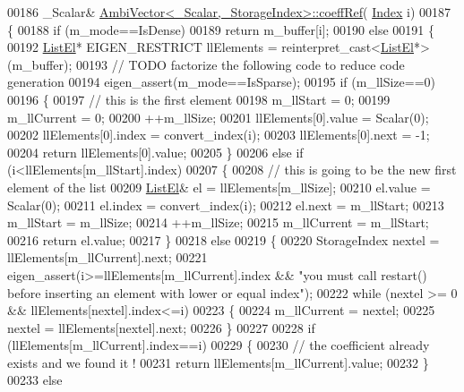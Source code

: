 \begin{DoxyCode}
00186 \_Scalar& \hyperlink{class_eigen_1_1internal_1_1_ambi_vector}{AmbiVector<\_Scalar,\_StorageIndex>::coeffRef}(
      \hyperlink{namespace_eigen_a62e77e0933482dafde8fe197d9a2cfde}{Index} i)
00187 \{
00188   \textcolor{keywordflow}{if} (m\_mode==IsDense)
00189     \textcolor{keywordflow}{return} m\_buffer[i];
00190   \textcolor{keywordflow}{else}
00191   \{
00192     \hyperlink{struct_eigen_1_1internal_1_1_ambi_vector_1_1_list_el}{ListEl}* EIGEN\_RESTRICT llElements = \textcolor{keyword}{reinterpret\_cast<}\hyperlink{struct_eigen_1_1internal_1_1_ambi_vector_1_1_list_el}{ListEl}*\textcolor{keyword}{>}(m\_buffer);
00193     \textcolor{comment}{// TODO factorize the following code to reduce code generation}
00194     eigen\_assert(m\_mode==IsSparse);
00195     \textcolor{keywordflow}{if} (m\_llSize==0)
00196     \{
00197       \textcolor{comment}{// this is the first element}
00198       m\_llStart = 0;
00199       m\_llCurrent = 0;
00200       ++m\_llSize;
00201       llElements[0].value = Scalar(0);
00202       llElements[0].index = convert\_index(i);
00203       llElements[0].next = -1;
00204       \textcolor{keywordflow}{return} llElements[0].value;
00205     \}
00206     \textcolor{keywordflow}{else} \textcolor{keywordflow}{if} (i<llElements[m\_llStart].index)
00207     \{
00208       \textcolor{comment}{// this is going to be the new first element of the list}
00209       \hyperlink{struct_eigen_1_1internal_1_1_ambi_vector_1_1_list_el}{ListEl}& el = llElements[m\_llSize];
00210       el.value = Scalar(0);
00211       el.index = convert\_index(i);
00212       el.next = m\_llStart;
00213       m\_llStart = m\_llSize;
00214       ++m\_llSize;
00215       m\_llCurrent = m\_llStart;
00216       \textcolor{keywordflow}{return} el.value;
00217     \}
00218     \textcolor{keywordflow}{else}
00219     \{
00220       StorageIndex nextel = llElements[m\_llCurrent].next;
00221       eigen\_assert(i>=llElements[m\_llCurrent].index && \textcolor{stringliteral}{"you must call restart() before inserting an element
       with lower or equal index"});
00222       \textcolor{keywordflow}{while} (nextel >= 0 && llElements[nextel].index<=i)
00223       \{
00224         m\_llCurrent = nextel;
00225         nextel = llElements[nextel].next;
00226       \}
00227 
00228       \textcolor{keywordflow}{if} (llElements[m\_llCurrent].index==i)
00229       \{
00230         \textcolor{comment}{// the coefficient already exists and we found it !}
00231         \textcolor{keywordflow}{return} llElements[m\_llCurrent].value;
00232       \}
00233       \textcolor{keywordflow}{else}

\end{DoxyCode}
